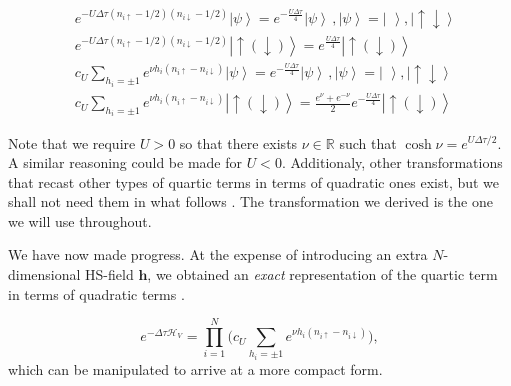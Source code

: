 \begin{equation}
\begin{split}
&e^{-U \Delta\tau (n_{i\uparrow} - 1/2 ) (n_{i\downarrow} - 1/2 )} \left| \psi \right\rangle = e^{-\frac{U\Delta \tau}{4}} \left| \psi \right\rangle \, , \left| \psi \right\rangle = \left| \, \, \right\rangle, \left| \uparrow \downarrow \right\rangle \\
&e^{-U \Delta\tau (n_{i\uparrow} - 1/2 ) (n_{i\downarrow} - 1/2 )} \left| \uparrow (\downarrow) \right\rangle = e^{\frac{U\Delta \tau}{4}} \left| \uparrow (\downarrow) \right\rangle \\
&c_U \sum_{h_i = \pm 1} e^{\nu h_i (n_{i\uparrow} - n_{i\downarrow} )} \left| \psi \right\rangle = e^{-\frac{U\Delta \tau}{4}} \left| \psi \right\rangle \, , \left| \psi \right\rangle = \left| \, \, \right\rangle, \left| \uparrow \downarrow \right\rangle \\
&c_U \sum_{h_i = \pm 1} e^{\nu h_i (n_{i\uparrow} - n_{i\downarrow} )} \left| \uparrow (\downarrow) \right\rangle= \frac{e^\nu + e^{-\nu}}{2} e^{-\frac{U\Delta \tau}{4}}  \left| \uparrow (\downarrow) \right\rangle
\end{split}
\end{equation}

Note that we require $U > 0$ so that there exists $\nu \in \mathbb{R}$ such that $\cosh \nu = e^{U\Delta \tau / 2}$. A similar reasoning could be made for $U < 0$. Additionaly, other transformations that recast other types of quartic terms in terms of quadratic ones exist, but we shall not need them in what follows \cite{hirsch_monte_1983}. The transformation we derived is the one we will use throughout.

We have now made progress. At the expense of introducing an extra $N$-dimensional HS-field $\bm h$, we obtained an \emph{exact} representation of the quartic term in terms of quadratic terms \cite{hou_numerical_2009}.

\begin{equation} 
 e^{-\Delta\tau \mathcal{H}_V} = \prod_{i=1}^N \bigg( c_U \sum_{h_i = \pm 1} e^{\nu h_i ( n_{i\uparrow} - n_{i\downarrow} )} \bigg),
\end{equation} 
which can be manipulated to arrive at a more compact form.

